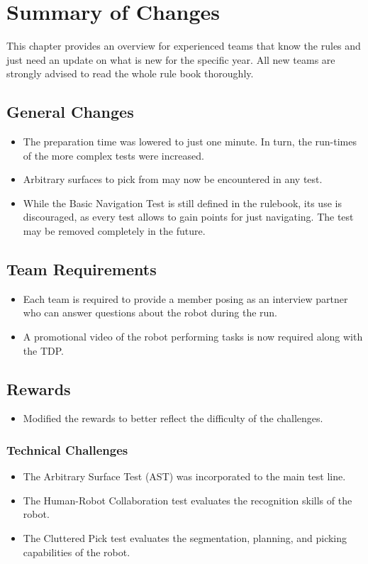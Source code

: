 
\chapter{Summary of Changes}

This chapter provides an overview for experienced teams that know the rules and just need an update on what is new for the specific year. All new teams are strongly advised to read the whole rule book thoroughly.

\section{General Changes}
\begin{itemize}
  \item The preparation time was lowered to just one minute. In turn, the run-times of the more complex tests were increased.
  \item Arbitrary surfaces to pick from may now be encountered in any test.
  \item While the Basic Navigation Test is still defined in the rulebook, its use is discouraged, as every test allows to gain points for just navigating. The test may be removed completely in the future.
\end{itemize}

\section{Team Requirements}
\begin{itemize}
  \item Each team is required to provide a member posing as an interview partner who can answer questions about the robot during the run.
  \item A promotional video of the robot performing {\RCAW} tasks is now required along with the TDP.
\end{itemize}

\section{Rewards}
\begin{itemize}
  \item Modified the rewards to better reflect the difficulty of the challenges.
\end{itemize}

\subsection{Technical Challenges}
\begin{itemize}
  \item The Arbitrary Surface Test (AST) was incorporated to the main test line.
  \item The Human-Robot Collaboration test evaluates the recognition skills of the robot.
  \item The Cluttered Pick test evaluates the segmentation, planning, and picking capabilities of the robot.
\end{itemize}
